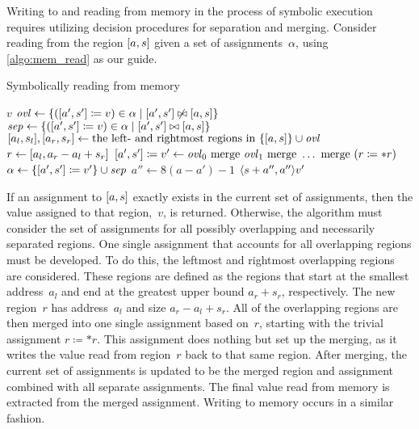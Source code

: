 Writing to and reading from memory in the process of symbolic execution
requires utilizing decision procedures for separation and merging.
Consider reading from the region $[a,s]$ given a set of assignments~$\alpha$,
using \cref{algo:mem_read} as our guide.
\begin{algorithm}
  \caption{Symbolically reading from memory}\label{algo:mem_read}
  \begin{algorithmic}[1]
    \State\Return $v$
    \Else
    \State $\mathit{ovl}\gets\{([a',s']\coloneqq v)\in\alpha\mid[a',s']\not\bowtie[a,s]\}$
    \State $\mathit{sep}\gets\{([a',s']\coloneqq v)\in\alpha\mid[a',s']\bowtie[a,s]\}$
    \State $[a_l,s_l],[a_r,s_r]\gets\text{the left- and rightmost regions in }\{[a,s]\}\cup\mathit{ovl}$
    \State $r\gets[a_l,a_r-a_l+s_r]$
    \State $[a',s']\coloneqq v'\gets\mathit{ovl}_0\text{ merge }\mathit{ovl}_1\text{ merge }\ldots\text{ merge }(r\coloneqq *r)$
    \State $\alpha\gets\{[a',s']\coloneqq v'\}\cup\mathit{sep}$
    \State $a''\gets8(a-a')-1$
    \State\Return $\langle s+a'',a''\rangle v'$
    \EndIf
    \EndFunction
  \end{algorithmic}
\end{algorithm}
If an assignment to $[a,s]$ exactly exists in the current set of assignments,
then the value assigned to that region,~$v$, is returned.
Otherwise, the algorithm must consider the set of assignments
for all possibly overlapping and necessarily separated regions.
One single assignment that accounts for all overlapping regions must be developed.
To do this, the leftmost and rightmost overlapping regions are considered.
These regions are defined as the regions that start at the smallest address~$a_l$
and end at the greatest upper bound $a_r+s_r$, respectively.
The new region~$r$ has address~$a_l$ and size $a_r-a_l+s_r$.
All of the overlapping regions are then merged into one single assignment based on~$r$,
starting with the trivial assignment $r\coloneqq *r$.
This assignment does nothing but set up the merging,
as it writes the value read from region~$r$ back to that same region.
After merging, the current set of assignments is updated to be the merged region
and assignment combined with all separate assignments.
The final value read from memory is extracted from the merged assignment.
Writing to memory occurs in a similar fashion.
